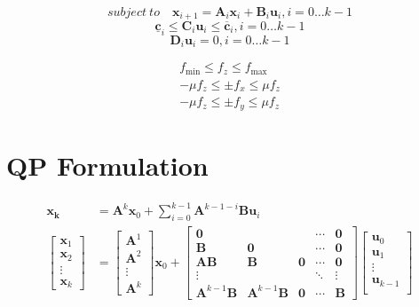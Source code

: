 \documentclass{article}
\begin{document}
$$
subject \  to \quad \mathbf{x}_{i+1}=\mathbf{A}_{i} \mathbf{x}_{i}+\mathbf{B}_{i} \mathbf{u}_{i}, i=0 \ldots k-1
$$
$$
\underline{\mathbf{c}}_{i} \leq \mathbf{C}_{i} \mathbf{u}_{i} \leq \overline{\mathbf{c}}_{i}, i=0 \ldots k-1
$$
$$
\mathbf{D}_{i} \mathbf{u}_{i}=0, i=0 \ldots k-1
$$

$$
\begin{array}{r}
    f_{\min } \leq f_{z} \leq f_{\max } \\
    -\mu f_{z} \leq \pm f_{x} \leq \mu f_{z} \\
    -\mu f_{z} \leq \pm f_{y} \leq \mu f_{z}
\end{array}
$$

\section{QP Formulation}
$$
\begin{aligned}
    \bm{x_k} &= \mathbf A^k\bm x_0 + \sum_{i=0}^{k-1}\mathbf{A}^{k-1-i}\mathbf B \mathbf u_i\\
    \left[
        \begin{array}{c}
            \bm x_1\\
            \bm x_2\\
            \vdots \\
            \bm x_k
        \end{array}
    \right]
    &=
    \left[
        \begin{array}{c}
            \mathbf A^1\\
            \mathbf A^2\\
            \vdots\\
            \mathbf A^k
        \end{array}
    \right]
    \bm x_0
    +
    \left[
        \begin{array}{ccccc}
            \bm 0 & & &\cdots & \bm 0\\
            \mathbf B & \bm 0 && \cdots & \bm 0\\
            \mathbf{AB} & \mathbf B & \bm 0 & \cdots & \bm 0\\
            \vdots & & & \ddots & \vdots\\
            \mathbf{A}^{k-1}\mathbf B & \mathbf{A}^{k-1}\mathbf B & \bm 0 & \cdots & \mathbf B
        \end{array}
    \right]
    \left[
        \begin{array}{c}
            \mathbf u_0\\
            \mathbf u_1\\
            \vdots\\
            \mathbf u_{k-1}\\
        \end{array}
    \right]
\end{aligned}
$$
\end{document}
